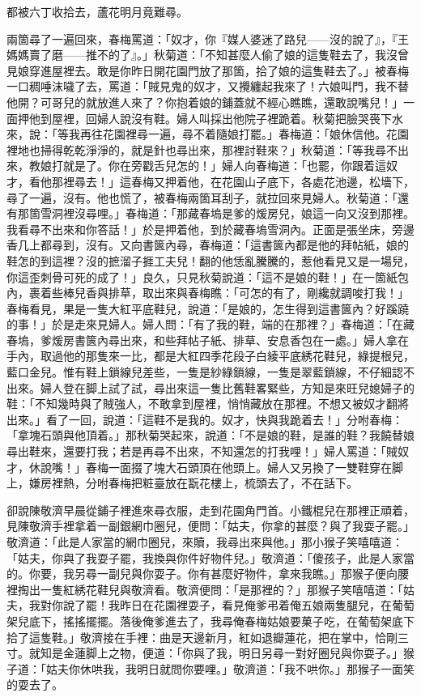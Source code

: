 \begin{myquote}
都被六丁收拾去，蘆花明月竟難尋。
\end{myquote}

兩箇尋了一遍回來，春梅罵道：「奴才，你『媒人婆迷了路兒——沒的說了』，『王媽媽賣了磨——推不的了』。」秋菊道：「不知甚麼人偷了娘的這隻鞋去了，我沒曾見娘穿進屋裡去。敢是你昨日開花園門放了那箇，拾了娘的這隻鞋去了。」被春梅一口稠唾沫噦了去，罵道：「賊見鬼的奴才，又攪纏起我來了！六娘叫門，我不替他開？可哥兒的就放進人來了？你抱着娘的鋪蓋就不經心瞧瞧，還敢說嘴兒！」一面押他到屋裡，回婦人說沒有鞋。婦人叫採出他院子裡跪着。秋菊把臉哭䘮下水來，說：「等我再往花園裡尋一遍，尋不着隨娘打罷。」春梅道：「娘休信他。花園裡地也掃得乾乾淨淨的，就是針也尋出來，那裡討鞋來？」秋菊道：「等我尋不出來，教娘打就是了。你在旁戳舌兒怎的！」婦人向春梅道：「也罷，你跟着這奴才，看他那裡尋去！」這春梅又押着他，在花園山子底下，各處花池邊，松墻下，尋了一遍，沒有。他也慌了，被春梅兩箇耳刮子，就拉回來見婦人。秋菊道：「還有那箇雪洞裡沒尋哩。」春梅道：「那藏春塢是爹的煖房兒，娘這一向又沒到那裡。我看尋不出來和你答話！」於是押着他，到於藏春塢雪洞內。正面是張坐床，旁邊香几上都尋到，沒有。又向書篋內尋，春梅道：「這書篋內都是他的拜帖紙，娘的鞋怎的到這裡？沒的摭溜子捱工夫兒！{}翻的他恁亂騰騰的，惹他看見又是一場兒，你這歪刺骨可死的成了！」良久，只見秋菊說道：「這不是娘的鞋！」{}在一箇紙包內，裹着些棒兒香與排草，取出來與春梅瞧：「可怎的有了，剛纔就調唆打我！」春梅看見，果是一隻大紅平底鞋兒，說道：「是娘的，怎生得到這書篋內？好蹊蹺的事！」於是走來見婦人。婦人問：「有了我的鞋，端的在那裡？」春梅道：「在藏春塢，爹煖房書篋內尋出來，和些拜帖子紙、排草、安息香包在一處。」婦人拿在手內，取過他的那隻來一比，都是大紅四季花段子白綾平底綉花鞋兒，綠提根兒，藍口金兒。惟有鞋上鎖線兒差些，一隻是紗綠鎖線，一隻是翠藍鎖線，不仔細認不出來。婦人登在脚上試了試，尋出來這一隻比舊鞋畧緊些，方知是來旺兒媳婦子的鞋：「不知幾時與了賊強人，不敢拿到屋裡，悄悄藏放在那裡。不想又被奴才翻將出來。」看了一回，說道：「這鞋不是我的。奴才，快與我跪着去！」分咐春梅：「拿塊石頭與他頂着。」那秋菊哭起來，說道：「不是娘的鞋，是誰的鞋？我饒替娘尋出鞋來，還要打我；若是再尋不出來，不知還怎的打我哩！」婦人罵道：「賊奴才，休說嘴！」春梅一面掇了塊大石頭頂在他頭上。婦人又另換了一雙鞋穿在脚上，嫌房裡熱，分咐春梅把粧臺放在翫花樓上，梳頭去了，不在話下。

卻說陳敬濟早晨從鋪子裡進來尋衣服，走到花園角門首。小鐵棍兒在那裡正頑着，見陳敬濟手裡拿着一副銀網巾圈兒，便問：「姑夫，你拿的甚麼？與了我耍子罷。」敬濟道：「此是人家當的網巾圈兒，來贖，我尋出來與他。」那小猴子笑嘻嘻道：「姑夫，你與了我耍子罷，我換與你件好物件兒。」敬濟道：「傻孩子，此是人家當的。你要，我另尋一副兒與你耍子。你有甚麼好物件，拿來我瞧。」那猴子便向腰裡掏出一隻紅綉花鞋兒與敬濟看。敬濟便問：「是那裡的？」那猴子笑嘻嘻道：「姑夫，我對你說了罷！我昨日在花園裡耍子，看見俺爹弔着俺五娘兩隻腿兒，在葡萄架兒底下，搖搖擺擺。{}落後俺爹進去了，我尋俺春梅姑娘要菓子吃，在葡萄架底下拾了這隻鞋。」敬濟接在手裡：曲是天邊新月，紅如退瓣蓮花，把在掌中，恰剛三寸。就知是金蓮脚上之物，便道：「你與了我，明日另尋一對好圈兒與你耍子。」猴子道：「姑夫你休哄我，我明日就問你要哩。」敬濟道：「我不哄你。」那猴子一面笑的耍去了。

